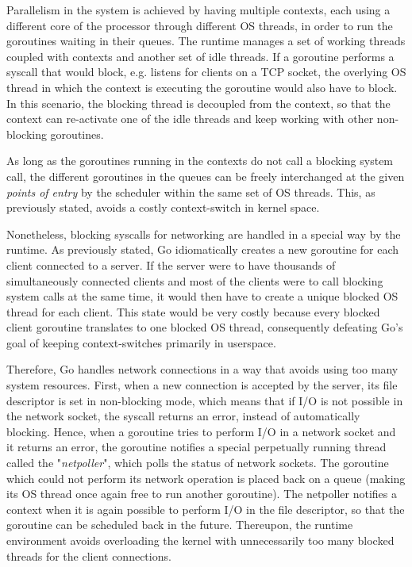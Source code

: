 Parallelism in the system is achieved by having multiple contexts, each using a different core of the processor through different OS threads, in order to run the  goroutines waiting in their queues. The runtime manages a set of working threads coupled with contexts and another set of idle threads.  If a goroutine performs a syscall that would block, e.g. listens for clients on a TCP socket, the overlying OS thread in which the context is executing the goroutine would also have to block. In this scenario, the blocking thread is decoupled from the context, so that the context can re-activate one of the idle threads and keep working with other non-blocking goroutines.

As long as the goroutines running in the contexts do not call a blocking system call, the different goroutines in the queues can be freely interchanged at the given \textit{points of entry} by the scheduler within the same set of OS threads. This, as previously stated, avoids a costly context-switch in kernel space. 

Nonetheless, blocking syscalls for networking are handled in a special way by the runtime. As previously stated, Go idiomatically creates a new goroutine for each client connected to a server. If the server were to have thousands of simultaneously connected clients and most of the clients were to call blocking system calls at the same time, it would then have to create a unique blocked OS thread for each client. This state would be very costly because every blocked client goroutine translates to one blocked OS thread, consequently defeating Go's goal of keeping context-switches primarily in userspace.

Therefore, Go handles network connections in a way that avoids using too many system resources. First, when a new connection is accepted by the server, its file descriptor is set in non-blocking mode, which means that if I/O is not possible in the network socket, the syscall returns an error, instead of automatically blocking. Hence, when a goroutine tries to perform I/O in a network socket and it returns an error, the goroutine notifies a special perpetually running thread called the "\textit{netpoller}", which polls the status of network sockets\cite{Morsing2013_2}. The goroutine which could not perform its network operation is placed back on a queue (making its OS thread once again free to run another goroutine). The netpoller notifies a context when it is again possible to perform I/O in the file descriptor, so that the goroutine can be scheduled back in the future. Thereupon, the runtime environment avoids overloading the kernel with unnecessarily too many blocked threads for the client connections.